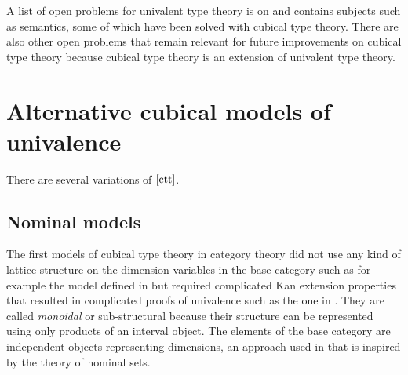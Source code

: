 \documentclass[12pt,a4paper,twoside,xetex,draft]{book}
\newcommand{\keyword}[1]{\emph{#1}\index{#1}}
\begin{document}
\begin{itemize}


\end{itemize}

A list of open problems for univalent type theory is on \cite{Awodey2019} and contains subjects such as semantics, some of which have been solved with cubical type theory. There are also other open problems that remain relevant for future improvements on cubical type theory because cubical type theory is an extension of univalent type theory.



\section{Alternative cubical models of univalence}

There are several variations of $\cref{ctt}$.

\subsection{Nominal models}\label{cartmod}

The first models of cubical type theory in category theory did not use any kind of lattice structure on the dimension variables in the base category such as for example the model defined in \cite{Bezem2014} but required complicated Kan extension properties that resulted in complicated proofs of univalence such as the one in \cite{Bezem2018}. They are called \keyword{monoidal} or sub-structural because their structure can be represented using only products of an interval object. The elements of the base category are independent objects representing dimensions, an approach used in \cite{Huber2016} that is inspired by the theory of nominal sets. 
\end{document}
